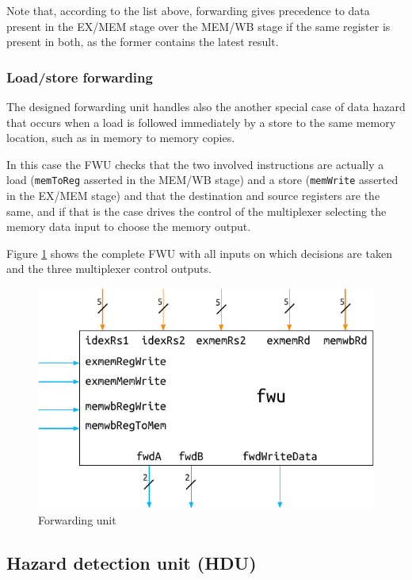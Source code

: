 \documentclass[a4paper]{article}
\begin{document}
Note that, according to the list above, forwarding gives precedence to data present in the EX/MEM stage over the MEM/WB stage if the same register is present in both, as the former contains the latest result.

\subsubsection{Load/store forwarding}
The designed forwarding unit handles also the another special case of data hazard that occurs when a load is followed immediately by a store to the same memory location, such as in memory to memory copies. 

In this case the FWU checks that the two involved instructions are actually a load (\texttt{memToReg} asserted in the MEM/WB stage) and a store (\texttt{memWrite} asserted in the EX/MEM stage) and that the destination and source registers are the same, and if that is the case drives the control of the multiplexer selecting the memory data input to choose the memory output.

Figure \ref{fig:fwu} shows the complete FWU with all inputs on which decisions are taken and the three multiplexer control outputs.

\begin{figure}[hbtp]
    \centering
    \includegraphics[]{../fwu/ref/schematic/fwu.pdf}
    \caption{Forwarding unit}
    \label{fig:fwu}
\end{figure}

\subsection{Hazard detection unit (HDU)}
\end{document}
